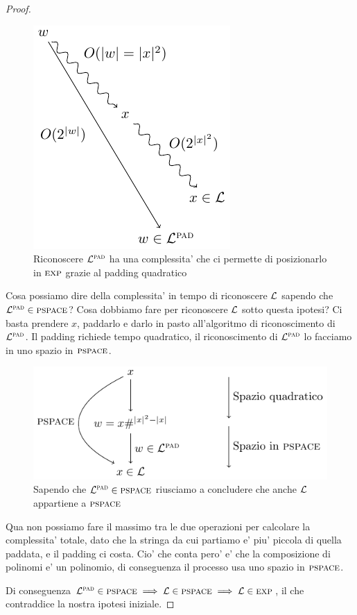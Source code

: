 \begin{proof}
    \begin{figure}[h]
        \begin{center}
            \includegraphics{./img/PaddingCheat.pdf}
            \caption{Riconoscere $\mathcal{L}^{\textsc{pad}}$ ha una complessita' che ci permette di posizionarlo in
            $\textsc{exp}$ grazie al padding quadratico}
        \end{center}
    \end{figure}

    Cosa possiamo dire della complessita' in tempo di riconoscere $\mathcal{L}$ sapendo che $\mathcal{L}^{\textsc{pad}} \in
    \textsc{pspace}$? Cosa dobbiamo fare per riconoscere $\mathcal{L}$ sotto questa ipotesi? Ci basta prendere
    $x$, paddarlo e darlo in pasto all'algoritmo di riconoscimento di $\mathcal{L}^{\textsc{pad}}$. Il padding richiede
    tempo quadratico, il riconoscimento di $\mathcal{L}^{\textsc{pad}}$ lo facciamo in uno spazio in $\textsc{pspace}$.

    \begin{figure}[h]
        \begin{center}
            \includegraphics{./img/LPadComplexity.pdf}
            \caption{Sapendo che $\mathcal{L}^{\textsc{pad}} \in \textsc{pspace}$ riusciamo a concludere che anche $\mathcal{L}$
            appartiene a $\textsc{pspace}$}
        \end{center}
    \end{figure}

    Qua non possiamo fare il massimo tra le due operazioni per calcolare la complessita' totale,
    dato che la stringa da cui partiamo e' piu' piccola di quella paddata, e il padding ci costa.
    Cio' che conta pero' e' che la composizione di polinomi e' un polinomio, di conseguenza il
    processo usa uno spazio in $\textsc{pspace}$.

    Di conseguenza $\mathcal{L}^{\textsc{pad}} \in \textsc{pspace} \implies \mathcal{L} \in \textsc{pspace} \implies \mathcal{L} \in \textsc{exp}$, il che
    contraddice la nostra ipotesi iniziale.
\end{proof}


